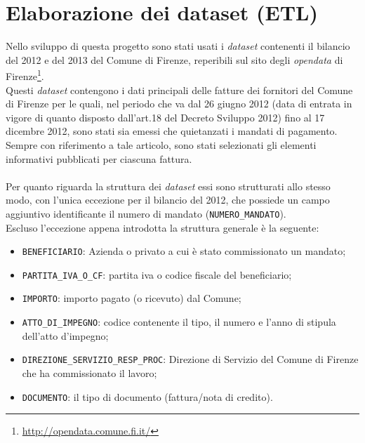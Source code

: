 \chapter{Elaborazione dei dataset (ETL)} \label{chap:elaborazione}

	Nello sviluppo di questa progetto sono stati usati i \textit{dataset} contenenti il bilancio del 2012 e del 2013 del Comune di Firenze, reperibili sul sito degli \textit{opendata} di Firenze\footnote{\url{http://opendata.comune.fi.it/}}.\\
	Questi \textit{dataset} contengono i dati principali delle fatture dei fornitori del Comune di Firenze per le quali, nel periodo che va dal 26 giugno 2012 (data di entrata in vigore di quanto disposto dall'art.18 del Decreto Sviluppo 2012) fino al 17 dicembre  2012, sono stati sia emessi che quietanzati i mandati di pagamento. Sempre con riferimento a tale articolo, sono stati selezionati gli elementi informativi pubblicati per ciascuna fattura.\\
	\\
	Per quanto riguarda la struttura dei \textit{dataset} essi sono strutturati allo stesso modo, con l'unica eccezione per il bilancio del 2012, che possiede un campo aggiuntivo identificante il numero di mandato (\texttt{NUMERO\_MANDATO}).\\
	Escluso l'eccezione appena introdotta la struttura generale è la seguente:
	\begin{itemize}
		\item \texttt{BENEFICIARIO}: Azienda o privato a cui è stato commissionato un mandato;
		\item \texttt{PARTITA\_IVA\_O\_CF}: partita iva o codice fiscale del beneficiario;
		\item \texttt{IMPORTO}: importo pagato (o ricevuto) dal Comune;
		\item \texttt{ATTO\_DI\_IMPEGNO}: codice contenente il tipo, il numero e l'anno di stipula dell'atto d'impegno;
		\item \texttt{DIREZIONE\_SERVIZIO\_RESP\_PROC}: Direzione di Servizio del Comune di Firenze che ha commissionato il lavoro;
		\item \texttt{DOCUMENTO}: il tipo di documento (fattura/nota di credito).
	\end{itemize}
	
